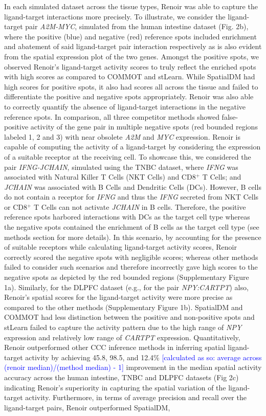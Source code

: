 In each simulated dataset across the tissue types, Renoir was able to capture the ligand-target interactions more precisely. To illustrate, we consider the ligand-target pair \textit{A2M-MYC}, simulated from the human intestine dataset (Fig. 2b), where the positive (blue) and negative (red) reference spots included enrichment and abatement of said ligand-target pair interaction respectively as is also evident from the spatial expression plot of the two genes. Amongst the positive spots, we observed Renoir's ligand-target activity scores to truly reflect the enriched spots with high scores as compared to COMMOT and stLearn. While SpatialDM had high scores for positive spots, it also had scores all across the tissue and failed to differentiate the positive and negative spots appropriately. Renoir was also able to correctly quantify the absence of ligand-target interactions in the negative reference spots. In comparison, all three competitor methods showed false-positive activity of the gene pair in multiple negative spots (red bounded regions labeled 1, 2 and 3) with near obsolete \textit{A2M} and \textit{MYC} expression. Renoir is capable of computing the activity of a ligand-target by considering the expression of a suitable receptor at the receiving cell. To showcase this, we considered the pair \textit{IFNG-JCHAIN}, simulated using the TNBC dataset, where \textit{IFNG} was associated with Natural Killer T Cells (NKT Cells) and CD8$^{+}$ T Cells; and \textit{JCHAIN} was associated with B Cells and Dendritic Cells (DCs). However, B cells do not contain a receptor for \textit{IFNG} and thus the \textit{IFNG} secreted from NKT Cells or CD8$^{+}$ T Cells can not activate \textit{JCHAIN} in B cells. Therefore, the positive reference spots harbored interactions with DCs as the target cell type whereas the negative spots contained the enrichment of B cells as the target cell type (see methods section for more details). In this scenario, by accounting for the presence of suitable receptors while calculating ligand-target activity scores, Renoir correctly scored the negative spots with negligible scores; whereas other methods failed to consider such scenarios and therefore incorrectly gave high scores to the negative spots as depicted by the red bounded regions (Supplementary Figure 1a). Similarly, for the DLPFC dataset (e.g., for the pair \textit{NPY:CARTPT}) also, Renoir's spatial scores for the ligand-target activity were more precise as compared to the other methods (Supplementary Figure 1b). SpatialDM and COMMOT had less distinction between the positive and non-positive spots and stLearn failed to capture the activity pattern due to the high range of \textit{NPY} expression and relatively low range of \textit{CARTPT} expression. Quantitatively, Renoir outperformed other CCC inference methods in inferring spatial ligand-target activity by achieving 45.8, 98.5, and 12.4\% \textcolor{blue}{[calculated as so: average across (renoir median)/(method median) - 1]} improvement in the median spatial activity accuracy across the human intestine, TNBC and DLPFC datasets (Fig 2c) indicating Renoir's superiority in capturing the spatial variation of the ligand-target activity. Furthermore, in terms of average precision and recall over the ligand-target pairs, Renoir outperformed SpatialDM, 